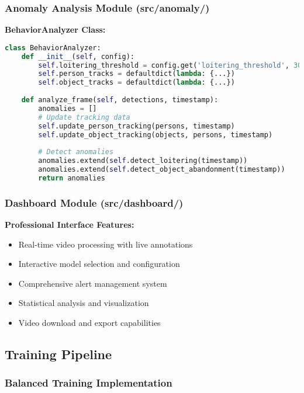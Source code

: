 \documentclass[12pt,a4paper]{article}
\begin{document}
\subsubsection{Anomaly Analysis Module (src/anomaly/)}

\textbf{BehaviorAnalyzer Class:}
\begin{lstlisting}[language=Python, caption=Behavior Analysis Implementation]
class BehaviorAnalyzer:
    def __init__(self, config):
        self.loitering_threshold = config.get('loitering_threshold', 30)
        self.person_tracks = defaultdict(lambda: {...})
        self.object_tracks = defaultdict(lambda: {...})
    
    def analyze_frame(self, detections, timestamp):
        anomalies = []
        # Update tracking data
        self.update_person_tracking(persons, timestamp)
        self.update_object_tracking(objects, persons, timestamp)
        
        # Detect anomalies
        anomalies.extend(self.detect_loitering(timestamp))
        anomalies.extend(self.detect_object_abandonment(timestamp))
        return anomalies
\end{lstlisting}

\subsubsection{Dashboard Module (src/dashboard/)}

\textbf{Professional Interface Features:}
\begin{itemize}
    \item Real-time video processing with live annotations
    \item Interactive model selection and configuration
    \item Comprehensive alert management system
    \item Statistical analysis and visualization
    \item Video download and export capabilities
\end{itemize}

\subsection{Training Pipeline}

\subsubsection{Balanced Training Implementation}
\end{document}
